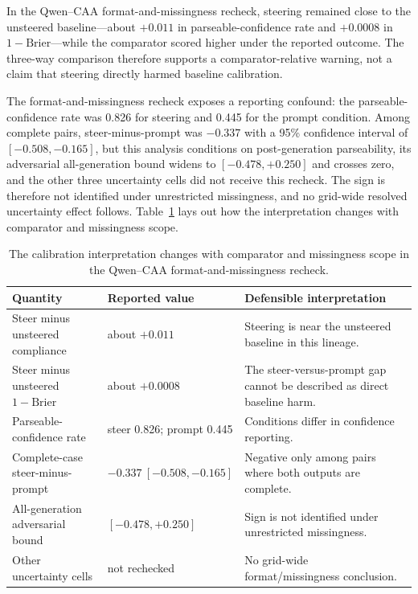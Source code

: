 \documentclass[manuscript,review,anonymous]{acmart}
\newcommand{\TopRule}{\toprule}
\begin{document}
In the Qwen--CAA format-and-missingness recheck, steering remained close to the unsteered baseline---about \(+0.011\) in parseable-confidence rate and \(+0.0008\) in \(1-\mathrm{Brier}\)---while the comparator scored higher under the reported outcome. {}%
{}%
The three-way comparison therefore supports a comparator-relative warning, not a claim that steering directly harmed baseline calibration.

The format-and-missingness recheck exposes a reporting confound: the parseable-confidence rate was 0.826 for steering and 0.445 for the prompt condition. {}%
Among complete pairs, steer-minus-prompt was \(-0.337\) with a 95\% confidence interval of \([-0.508,-0.165]\), but this analysis conditions on post-generation parseability, its adversarial all-generation bound widens to \([-0.478,+0.250]\) and crosses zero, and the other three uncertainty cells did not receive this recheck. {}%
{}%
{}%
{}%
The sign is therefore not identified under unrestricted missingness, and no grid-wide resolved uncertainty effect follows. Table~\ref{tab:calibration-scope} lays out how the interpretation changes with comparator and missingness scope. {}%

\begin{table}[t]
\centering
\small
\caption{The calibration interpretation changes with comparator and missingness scope in the Qwen--CAA format-and-missingness recheck.}
\label{tab:calibration-scope}
\begin{tabular}{@{}p{}p{}p{}@{}}
\TopRule
Quantity & Reported value & Defensible interpretation \\
\midrule
Steer minus unsteered compliance & about $+0.011$ & Steering is near the unsteered baseline in this lineage. \\
Steer minus unsteered $1-\mathrm{Brier}$ & about $+0.0008$ & The steer-versus-prompt gap cannot be described as direct baseline harm. \\
Parseable-confidence rate & steer 0.826; prompt 0.445 & Conditions differ in confidence reporting. \\
Complete-case steer-minus-prompt & $-0.337\ [-0.508,-0.165]$ & Negative only among pairs where both outputs are complete. \\
All-generation adversarial bound & $[-0.478,+0.250]$ & Sign is not identified under unrestricted missingness. \\
Other uncertainty cells & not rechecked & No grid-wide format/missingness conclusion. \\
\bottomrule
\end{tabular}
\end{table}
\end{document}

